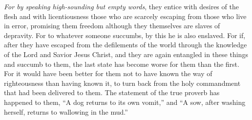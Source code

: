 \begin{biblechapter}
\verse \textit{For by speaking high-sounding but empty words}, they entice with desires of the flesh and with licentiousness those who are scarcely escaping from those who live in error,
\verse promising them freedom although they themselves are slaves of depravity. For to whatever someone succumbs, by this he is also enslaved.
\verse For if, after they have escaped from the defilements of the world through the knowledge of the Lord and Savior Jesus Christ, and they are again entangled in these things and succumb to them, the last state has become worse for them than the first.
\verse For it would have been better for them not to have known the way of righteousness than having known it, to turn back from the holy commandment that had been delivered to them.
\verse The statement of the true proverb has happened to them, “A dog returns to its own vomit,” and “A sow, after washing herself, returns to wallowing in the mud.”
\end{biblechapter}

